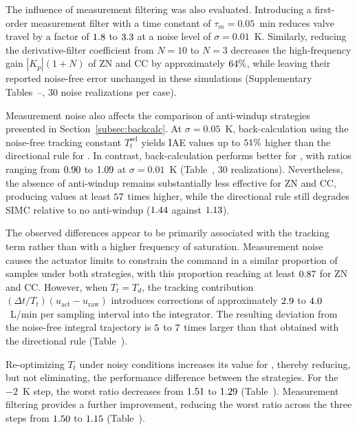 The influence of measurement filtering was also evaluated. Introducing a first-order measurement filter with a time constant of $\tau_m = 0.05$~min reduces valve travel by a factor of $1.8$ to $3.3$ at a noise level of $\sigma = 0.01$~K. Similarly, reducing the derivative-filter coefficient from $N = 10$ to $N = 3$ decreases the high-frequency gain $|K_p|(1+N)$ of ZN and CC by approximately $64\%$, while leaving their reported noise-free error unchanged in these simulations (Supplementary Tables~--, $30$ noise realizations per case).

Measurement noise also affects the comparison of anti-windup strategies presented in Section~\ref{subsec:backcalc}. At $\sigma = 0.05$~K, back-calculation using the noise-free tracking constant $T_t^{\mathrm{sel}}$ yields IAE values up to $51\%$ higher than the directional rule for \vnzbcworse{}. In contrast, back-calculation performs better for \vnzbcbetter{}, with ratios ranging from $0.90$ to $1.09$ at $\sigma = 0.01$~K (Table~, $30$ realizations). Nevertheless, the absence of anti-windup remains substantially less effective for ZN and CC, producing values at least $57$ times higher, while the directional rule still degrades SIMC relative to no anti-windup ($1.44$ against $1.13$).

The observed differences appear to be primarily associated with the tracking term rather than with a higher frequency of saturation. Measurement noise causes the actuator limits to constrain the command in a similar proportion of samples under both strategies, with this proportion reaching at least $0.87$ for ZN and CC. However, when $T_t = T_d$, the tracking contribution $(\Delta t/T_t)(u_{\mathrm{act}} - u_{\mathrm{raw}})$ introduces corrections of approximately $2.9$ to $4.0$~L/min per sampling interval into the integrator. The resulting deviation from the noise-free integral trajectory is $5$ to $7$ times larger than that obtained with the directional rule (Table~).

Re-optimizing $T_t$ under noisy conditions increases its value for \vnzttchanged{}, thereby reducing, but not eliminating, the performance difference between the strategies. For the $-2$~K step, the worst ratio decreases from $1.51$ to $1.29$ (Table~). Measurement filtering provides a further improvement, reducing the worst ratio across the three steps from $1.50$ to $1.15$ (Table~).

